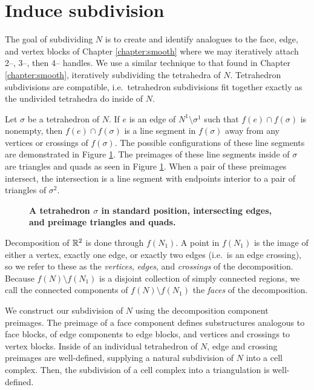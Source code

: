 \section{Induce subdivision}

The goal of subdividing $N$ is to create and identify analogues to the face, edge, and vertex blocks of Chapter \ref{chapter:smooth} where we may iteratively attach 2--, 3--, then 4-- handles.
We use a similar technique to that found in Chapter \ref{chapter:smooth}, iteratively subdividing the tetrahedra of $N$.
Tetrahedron subdivisions are compatible, i.e.\ tetrahedron subdivisions fit together exactly as the undivided tetrahedra do inside of $N$.

Let $\sigma$ be a tetrahedron of $N$.
If $e$ is an edge of $N^1\setminus\sigma^1$ such that $f(e)\cap f(\sigma)$ is nonempty, then $f(e)\cap f(\sigma)$ is a line segment in $f(\sigma)$ away from any vertices or crossings of $f(\sigma)$.
The possible configurations of these line segments are demonstrated in Figure \ref{fig:standard-position-intersection}.
The preimages of these line segments inside of $\sigma$ are triangles and quads as seen in Figure \ref{fig:standard-position-intersection}.
When a pair of these preimages intersect, the intersection is a line segment with endpoints interior to a pair of triangles of $\sigma^2$.

\begin{figure}[h!]
	\caption{
		\textbf{A tetrahedron $\sigma$ in standard position, intersecting edges, and preimage triangles and quads.}
	}
	\label{fig:standard-position-intersection}
\end{figure}


Decomposition of $\mathbb{R}^2$ is done through $f(N_1)$.
A point in $f(N_1)$ is the image of either a vertex, exactly one edge, or exactly two edges (i.e.\ is an edge crossing), so we refer to these as the \emph{vertices}, \emph{edges}, and \emph{crossings} of the decomposition.
Because $f(N)\setminus f(N_1)$  is a disjoint collection of simply connected regions, we call the connected components of $f(N)\setminus f(N_1)$ the \emph{faces} of the decomposition.

We construct our subdivision of $N$ using the decomposition component preimages.
The preimage of a face component defines substructures analogous to face blocks, of edge components to edge blocks, and vertices and crossings to vertex blocks.
Inside of an individual tetrahedron of $N$, edge and crossing preimages are well-defined, supplying a natural subdivision of $N$ into a cell complex.
Then, the subdivision of a cell complex into a triangulation is well-defined.

